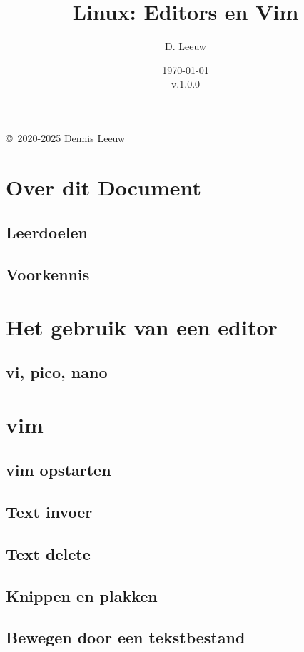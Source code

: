 \documentclass[a4paper,12pt,twoside,openright,titlepage]{book}
\author{D. Leeuw}
\title{Linux: Editors en Vim}
\date{\today\\v.1.0.0}
\begin{document}

\maketitle

\copyright\ 2020-2025 Dennis Leeuw\\




\frontmatter
\chapter{Over dit Document}
\section{Leerdoelen}

\section{Voorkennis}

%
%

\tableofcontents

\mainmatter

\chapter{Het gebruik van een editor}

\section{vi, pico, nano}

\chapter{vim}

\section{vim opstarten}

\section{Text invoer}

\section{Text delete}

\section{Knippen en plakken}

\section{Bewegen door een tekstbestand}


\backmatter
\printindex
\end{document}
